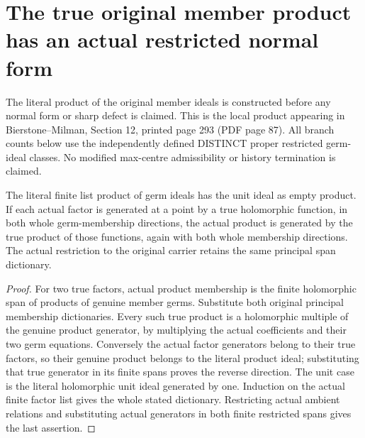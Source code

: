 \section{The true original member product has an actual restricted normal form}

The literal product of the original member ideals is constructed before
any normal form or sharp defect is claimed. This is the local product
appearing in Bierstone--Milman\cite{bierstone-milman97-invent-math},
Section 12, printed page 293 (PDF page 87). All branch counts below use
the independently defined DISTINCT proper restricted germ-ideal classes.
No modified max-centre admissibility or history termination is claimed.

\begin{lemma}
\label{hir:sharp-original-member-product-genuine-principal-dictionary}
\leanok
The literal finite list product of germ ideals has the unit ideal as
empty product. If each actual factor is generated at a point by a true
holomorphic function, in both whole germ-membership directions, the
actual product is generated by the true product of those functions,
again with both whole membership directions. The actual restriction to
the original carrier retains the same principal span dictionary.
\end{lemma}
\begin{proof}
For two true factors, actual product membership is the finite holomorphic
span of products of genuine member germs. Substitute both original
principal membership dictionaries. Every such true product is a
holomorphic multiple of the genuine product generator, by multiplying
the actual coefficients and their two germ equations. Conversely the
actual factor generators belong to their true factors, so their genuine
product belongs to the literal product ideal; substituting that true
generator in its finite spans proves the reverse direction. The unit
case is the literal holomorphic unit ideal generated by one. Induction
on the actual finite factor list gives the whole stated dictionary.
Restricting actual ambient relations and substituting actual generators
in both finite restricted spans gives the last assertion.
\end{proof}

